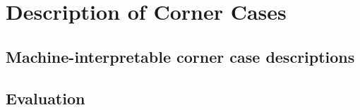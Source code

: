 \chapter{Description of Corner Cases}
\label{chap:description}

\section{Machine-interpretable corner case descriptions}
\label{sec:sensorik}

\section{Evaluation}

